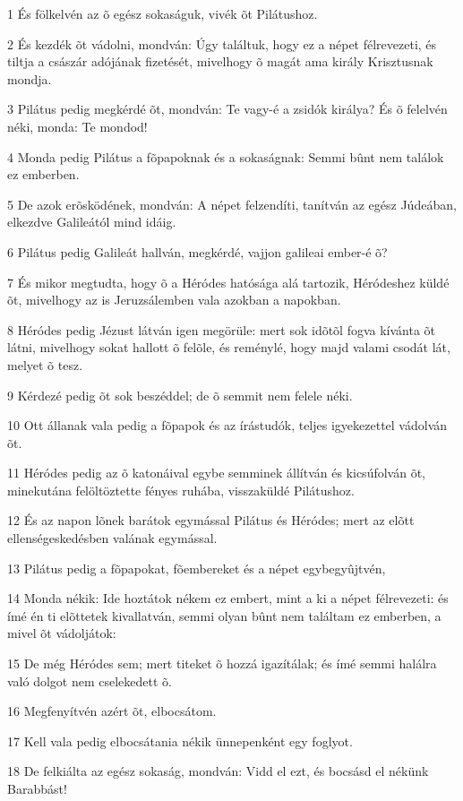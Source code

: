 \par 1 És fölkelvén az õ egész sokaságuk, vivék õt Pilátushoz.
\par 2 És kezdék õt vádolni, mondván: Úgy találtuk, hogy ez a népet félrevezeti, és tiltja a császár adójának fizetését,  mivelhogy õ magát ama király Krisztusnak mondja.
\par 3 Pilátus pedig megkérdé õt, mondván: Te vagy-é a zsidók királya? És õ felelvén néki, monda: Te mondod!
\par 4 Monda pedig Pilátus a fõpapoknak és a sokaságnak: Semmi bûnt nem találok ez emberben.
\par 5 De azok erõsködének, mondván: A népet felzendíti, tanítván az egész Júdeában, elkezdve Galileától mind idáig.
\par 6 Pilátus pedig Galileát hallván, megkérdé, vajjon galileai ember-é õ?
\par 7 És mikor megtudta, hogy õ a Héródes hatósága alá tartozik, Héródeshez küldé õt, mivelhogy az is Jeruzsálemben vala azokban a napokban.
\par 8 Héródes pedig Jézust látván igen megörüle: mert sok idõtõl fogva kívánta õt látni, mivelhogy sokat hallott õ felõle, és reménylé, hogy majd valami csodát lát, melyet õ tesz.
\par 9 Kérdezé pedig õt sok beszéddel; de õ semmit nem felele néki.
\par 10 Ott állanak vala pedig a fõpapok és az írástudók, teljes igyekezettel vádolván õt.
\par 11 Héródes pedig az õ katonáival egybe semminek állítván és kicsúfolván õt, minekutána felöltöztette fényes ruhába, visszaküldé Pilátushoz.
\par 12 És az napon lõnek barátok egymással Pilátus és Héródes; mert az elõtt ellenségeskedésben valának egymással.
\par 13 Pilátus pedig a fõpapokat, fõembereket és a népet egybegyûjtvén,
\par 14 Monda nékik: Ide hoztátok nékem ez embert, mint a ki a népet félrevezeti: és ímé én ti elõttetek kivallatván, semmi olyan bûnt nem találtam ez emberben, a mivel õt vádoljátok:
\par 15 De még Héródes sem; mert titeket õ hozzá igazítálak; és ímé semmi halálra való dolgot nem cselekedett õ.
\par 16 Megfenyítvén azért õt, elbocsátom.
\par 17 Kell vala pedig elbocsátania nékik ünnepenként egy foglyot.
\par 18 De felkiálta az egész sokaság, mondván: Vidd el ezt, és bocsásd el nékünk Barabbást!
